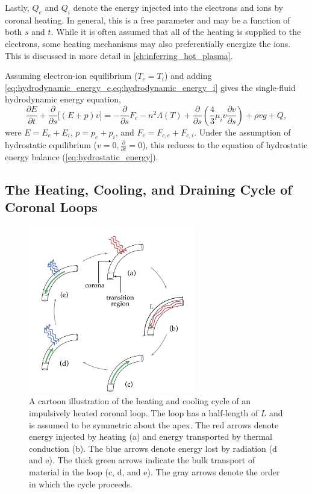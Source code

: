 Lastly, $Q_e$ and $Q_i$ denote the energy injected into the electrons and ions by coronal heating. In general, this is a free parameter and may be a function of both $s$ and $t$. While it is often assumed that all of the heating is supplied to the electrons, some heating mechanisms may also preferentially energize the ions. This is discussed in more detail in \autoref{ch:inferring_hot_plasma}. 

Assuming electron-ion equilibrium ($T_e=T_i$) and adding \cref{eq:hydrodynamic_energy_e,eq:hydrodynamic_energy_i} gives the single-fluid hydrodynamic energy equation,
\begin{equation}\label{eq:hydrodynamic_energy}
    \frac{\partial E}{\partial t} + \frac{\partial}{\partial s}\lbrack(E+p)v\rbrack = - \frac{\partial}{\partial s}F_c - n^2\Lambda(T) + \frac{\partial}{\partial s}\left(\frac{4}{3}\mu_iv\frac{\partial v}{\partial s}\right) +\rho vg + Q, 
\end{equation}
were $E=E_e + E_i$, $p=p_e+p_i$, and $F_c=F_{c,e} + F_{c,i}$. Under the  assumption of hydrostatic equilibrium ($v=0,\frac{\partial}{\partial t}=0$), this reduces to the equation of hydrostatic energy balance (\autoref{eq:hydrostatic_energy}).

\subsection{The Heating, Cooling, and Draining Cycle of Coronal Loops}\label{sec:heating-cooling-cycle}

\begin{figure}[!h]
    \centering
    \includegraphics[width=0.65\textwidth]{chapter2/figures/heating-cooling-cycle-cartoon.pdf}
    \caption{A cartoon illustration of the heating and cooling cycle of an impulsively heated coronal loop. The loop has a half-length of $L$ and is assumed to be symmetric about the apex. The red arrows denote energy injected by heating (a) and energy transported by thermal conduction (b). The blue arrows denote energy lost by radiation (d and e). The thick green arrows indicate the bulk transport of material in the loop (c, d, and e). The gray arrows denote the order in which the cycle proceeds.}
    \label{fig:heating-cooling-cycle-cartoon}
\end{figure}

